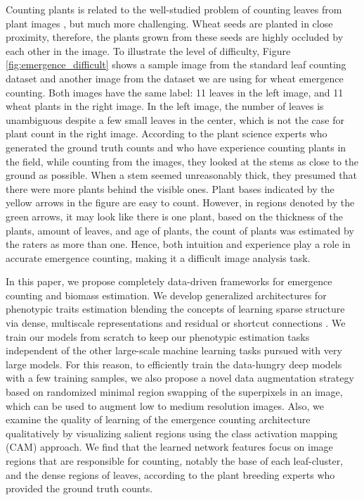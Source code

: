 \documentclass[10pt,twocolumn,letterpaper]{article}
\begin{document}
Counting plants is related to the well-studied problem of counting leaves from plant images \cite{cvppp2015_winner, aich-cvppp2017}, but much more challenging. Wheat seeds are planted in close proximity, therefore, the plants grown from these seeds are highly occluded by each other in the image. To illustrate the level of difficulty, Figure \ref{fig:emergence_difficult} shows a sample image from the standard leaf counting dataset \cite{dataset-cvppp2017-03} and another image from the dataset we are using for wheat emergence counting. Both images have the same label: 11 leaves in the left image, and 11 wheat plants in the right image. In the left image, the number of leaves is unambiguous despite a few small leaves in the center, which is not the case for plant count in the right image. According to the plant science experts who generated the ground truth counts and who have experience counting plants in the field, while counting from the images, they looked at the stems as close to the ground as possible. When a stem seemed unreasonably thick, they presumed that there were more plants behind the visible ones. Plant bases indicated by the yellow arrows in the figure are easy to count. However, in regions denoted by the green arrows, it may look like there is one plant, based on the thickness of the plants, amount of leaves, and age of plants, the count of plants was estimated by the raters as more than one. Hence, both intuition and experience play a role in accurate emergence counting, making it a difficult image analysis task.

In this paper, we propose completely data-driven frameworks for emergence counting and biomass estimation.
We develop generalized architectures for phenotypic traits estimation blending the concepts of learning sparse structure via dense, multiscale representations \cite{inception-01} and residual or shortcut connections \cite{resnet}.
%
We train our models from scratch to keep our phenotypic estimation tasks independent of the other large-scale machine learning tasks pursued with very large models. For this reason, to efficiently train the data-hungry deep models with a few training samples, we also propose a novel data augmentation strategy based on randomized minimal region swapping of the superpixels in an image, which can be used to augment low to medium resolution images.
%
Also, we examine the quality of learning of the emergence counting architecture qualitatively by visualizing salient regions using the class activation mapping (CAM) \cite{cam-mit} approach. We find that the learned network features focus on image regions that are responsible for counting, notably the base of each leaf-cluster, and the dense regions of leaves, according to the plant breeding experts who provided the ground truth counts.
\end{document}
